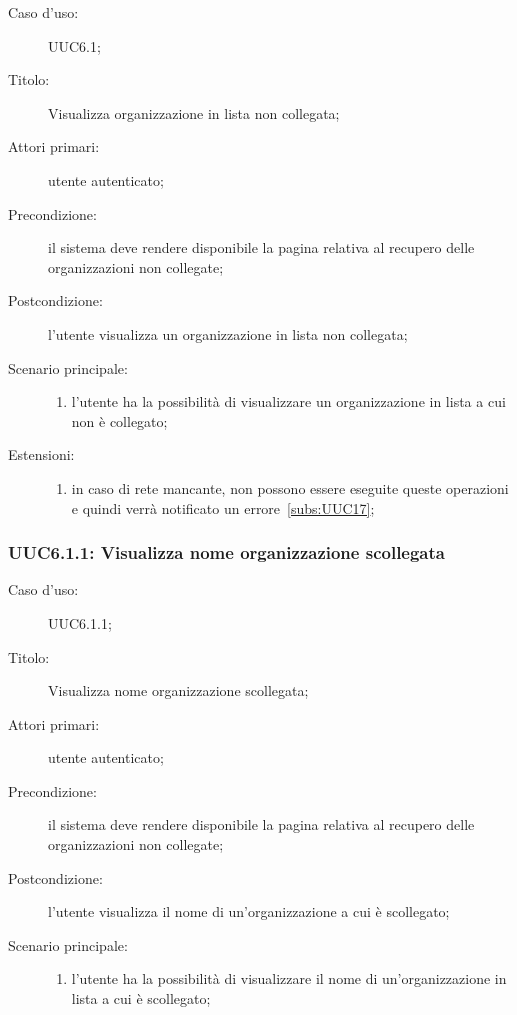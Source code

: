\documentclass[../../../analisi-dei-requisiti.tex]{subfiles}
\begin{document}
\begin{description}
  \item[Caso d’uso:] UUC6.1;
  \item[Titolo:] Visualizza organizzazione in lista non collegata;
  \item[Attori primari:] utente autenticato;
  \item[Precondizione:] il sistema deve rendere disponibile la pagina relativa al recupero delle organizzazioni non collegate;
  \item[Postcondizione:] l'utente visualizza un organizzazione in lista non collegata;
  \item[Scenario principale:]
        \begin{enumerate}
          \item l'utente ha la possibilità di visualizzare un organizzazione in lista a cui non è collegato;
        \end{enumerate}
  \item[Estensioni:]
        \begin{enumerate}
          \item in caso di rete mancante, non possono essere eseguite queste operazioni e quindi verrà notificato un errore~\ref{subs:UUC17};
        \end{enumerate}
\end{description}


\subsubsection{UUC6.1.1: Visualizza nome organizzazione scollegata}%
\label{subs:UUC6.1.1}
\begin{description}
  \item[Caso d’uso:] UUC6.1.1;
  \item[Titolo:] Visualizza nome organizzazione scollegata;
  \item[Attori primari:] utente autenticato;
  \item[Precondizione:] il sistema deve rendere disponibile la pagina relativa al recupero delle organizzazioni non collegate;
  \item[Postcondizione:] l'utente visualizza il nome di un'organizzazione a cui è scollegato;
  \item[Scenario principale:]
        \begin{enumerate}
          \item l'utente ha la possibilità di visualizzare il nome di un'organizzazione in lista a cui è scollegato;
        \end{enumerate}
\end{description}
\end{document}

